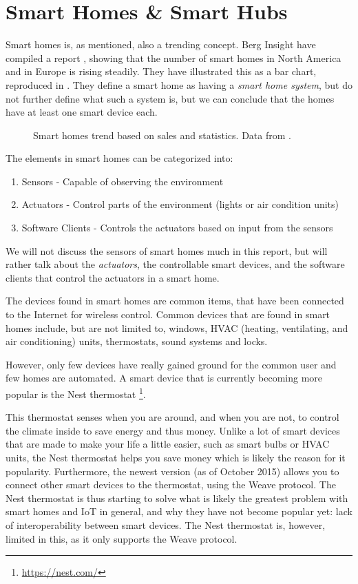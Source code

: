 \section{Smart Homes \& Smart Hubs}\label{sec:smarthomes}
Smart homes is, as mentioned, also a trending concept. 
Berg Insight have compiled a report \cite{SMARTHOMETREND}, 
showing that the number of smart homes in North America and in Europe is rising steadily. 
They have illustrated this as a bar chart, reproduced in .
They define a smart home as having a \emph{smart home system}, 
but do not further define what such a system is, 
but we can conclude that the homes have at least one smart device each. 

\begin{figure}[!htb]
  \centering
  
  \caption{Smart homes trend based on sales and statistics. Data from \protect\cite{SMARTHOMETREND}.}
  \label{fig:smarthomestrend}
\end{figure}

The elements in smart homes can be categorized into:
\begin{enumerate}
  \item Sensors - Capable of observing the environment
  \item Actuators - Control parts of the environment (\eg lights or air condition units)
  \item Software Clients - Controls the actuators based on input from the sensors
\end{enumerate}

We will not discuss the sensors of smart homes much in this report, 
but will rather talk about the \emph{actuators}, 
\ie the controllable smart devices,
and the software clients that control the actuators in a smart home.

The devices found in smart homes are common items, 
that have been connected to the Internet for wireless control.
Common devices that are found in smart homes include, but are not limited to, 
windows, HVAC (heating, ventilating, and air conditioning) units, thermostats, sound systems and locks. 

However, only few devices have really gained ground for the common user and few homes are automated.
A smart device that is currently becoming more popular is the Nest thermostat \footnote{\url{https://nest.com/}}. 

This thermostat senses when you are around, and when you are not, 
to control the climate inside to save energy and thus money.
Unlike a lot of smart devices that are made to make your life a little easier, such as smart bulbs or HVAC units,
the Nest thermostat helps you save money which is likely the reason for it popularity. 
Furthermore, the newest version (as of October 2015) allows you to connect other smart devices to the thermostat, 
using the Weave protocol. 
The Nest thermostat is thus starting to solve what is likely the greatest problem with smart homes and IoT in general, 
and why they have not become popular yet: lack of interoperability between smart devices. 
The Nest thermostat is, however, limited in this, 
as it only supports the Weave protocol. 

